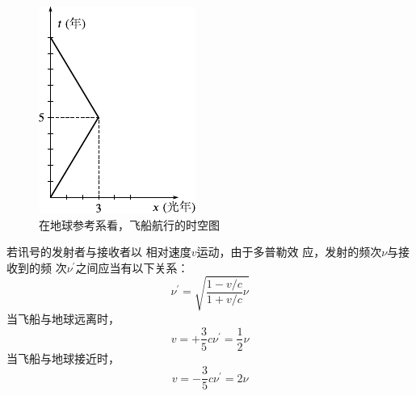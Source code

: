 \begin{figure}
    \centering
    \includegraphics{figure/fig11.02}
    \caption{在地球参考系看，飞船航行的时空图}
    \label{fig:11.02}
\end{figure}
若讯号的发射者与接收者以
相对速度$ v $运动，由于多普勒效
应，发射的频次$ \nu $与接收到的频
次$ \nu ^ \prime $之间应当有以下关系：
{\setlength{\mathindent}{4em}
\begin{equation*}
    \nu ^ { \prime } = \sqrt { \frac { 1 - v / c } { 1 + v / c }  \nu }
\end{equation*}}
当飞船与地球远离时，
{\setlength{\mathindent}{4em}
\begin{equation*}
    v = + \frac { 3 } { 5 } c   \nu ^ { \prime } = \frac 1 2 \nu
\end{equation*}}
当飞船与地球接近时，
{\setlength{\mathindent}{4em}
\begin{equation*}
    v = - \frac { 3 } { 5 } c   \nu ^ { \prime } = 2 \nu
\end{equation*}}

